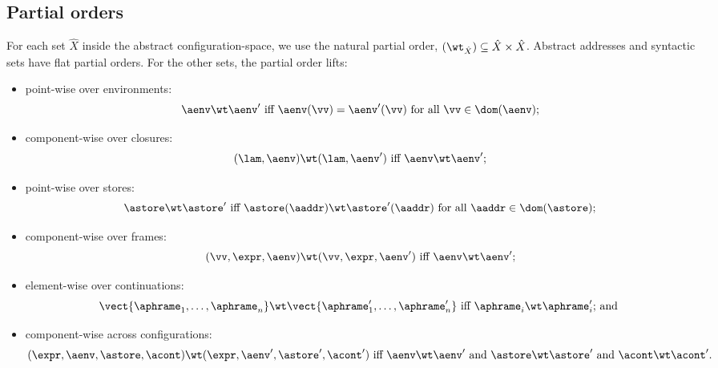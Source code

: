   \subsection{Partial orders}

  For each set $\hat X$ inside the abstract configuration-space, we use the
  natural partial order, $(\wt_{\hat X}) \subseteq \hat X \times \hat X$.
Abstract addresses and syntactic sets have flat partial orders.
For the other sets, the
  partial order lifts:
  \begin{itemize}
\item point-wise over environments:
  \begin{equation*}
  \aenv \wt \aenv' \text{ iff }
  \aenv(\vv) = \aenv'(\vv) \text{ for all } \vv \in \dom(\aenv)
  \text;
  \end{equation*}



\item component-wise over closures:
  \begin{equation*}
  (\lam,\aenv) \wt (\lam,\aenv') \text{ iff } \aenv \wt \aenv'
  \text;
  \end{equation*}

\item point-wise over stores:
  \begin{equation*}
  \astore \wt \astore' 
  \text{ iff }
  \astore(\aaddr) \wt \astore'(\aaddr) \text{ for all } \aaddr
\in \dom(\astore)
  \text;
  \end{equation*}

\item component-wise over frames:
  \begin{equation*}
  (\vv,\expr,\aenv) \wt (\vv,\expr,\aenv') \text{ iff } \aenv \wt \aenv'
  \text;
  \end{equation*}

\item element-wise over continuations:
  \begin{equation*}
  \vect{\aphrame_1,\ldots,\aphrame_n} 
  \wt 
  \vect{\aphrame'_1,\ldots,\aphrame'_n} 
  \text{ iff }
  \aphrame_i \wt \aphrame'_i
  \text{; and }
  \end{equation*}

\item component-wise across configurations:
  \begin{equation*}
(\expr,\aenv,\astore,\acont) 
  \wt
  (\expr,\aenv',\astore',\acont')
  \text{ iff }
  \aenv \wt \aenv'
  \text{ and }
  \astore \wt \astore'
  \text{ and }
  \acont \wt \acont'
  \text.
  \end{equation*}
  \end{itemize}



